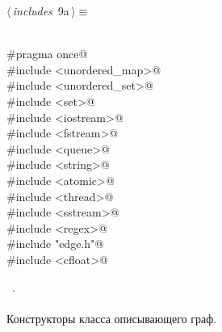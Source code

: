 \documentclass[12pt]{article}
\begin{document}
\begin{flushleft} \small
\begin{minipage}{\linewidth}\label{scrap7}\raggedright\small
{} $\langle\,${\itshape includes}\nobreak\ {\footnotesize {9a}}$\,\rangle\equiv$
\vspace{-1ex}
\begin{list}{}{} \item
\mbox{}\verb@@\\
\mbox{}\verb@#pragma once@\\
\mbox{}\verb@#include <unordered_map>@\\
\mbox{}\verb@#include <unordered_set>@\\
\mbox{}\verb@#include <set>@\\
\mbox{}\verb@#include <iostream>@\\
\mbox{}\verb@#include <fstream>@\\
\mbox{}\verb@#include <queue>@\\
\mbox{}\verb@#include <string>@\\
\mbox{}\verb@#include <atomic>@\\
\mbox{}\verb@#include <thread>@\\
\mbox{}\verb@#include <sstream>@\\
\mbox{}\verb@#include <regex>@\\
\mbox{}\verb@#include "edge.h"@\\
\mbox{}\verb@#include <cfloat>@\\
\mbox{}\verb@@{\NWsep}
\end{list}
\vspace{-1.5ex}
\footnotesize
\begin{list}{}{\setlength{\itemsep}{-\parsep}\setlength{\itemindent}{-\leftmargin}}
\item \NWtxtMacroRefIn\ .

\item{}
\end{list}
\end{minipage}\vspace{4ex}
\end{flushleft}
\paragraph{}
Конструкторы класса описывающего граф.
\end{document}
